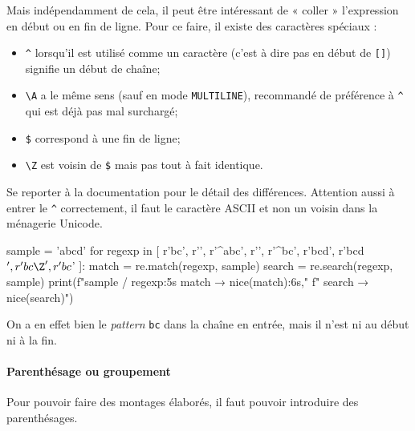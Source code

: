 Mais indépendamment de cela, il peut être intéressant de « coller » l'expression en début ou en fin de ligne. Pour ce faire, il existe des caractères spéciaux :
\begin{itemize}
\item \lstinline[basicstyle={\small\shellttfont}]{^} lorsqu'il est utilisé comme un caractère (c'est à dire pas en début de \texttt{[]}) signifie un début de chaîne;
\item \lstinline[basicstyle={\small\shellttfont}]{\A} a le même sens (sauf en mode \texttt{MULTILINE}), recommandé de préférence à \texttt{\textasciicircum} qui est déjà pas mal surchargé;
\item \lstinline[basicstyle={\small\shellttfont}]{$} correspond à une fin de ligne;
\item \lstinline[basicstyle={\small\shellttfont}]{\Z} est voisin de \texttt{\$} mais pas tout à fait identique.
\end{itemize}

Se reporter à la documentation pour le détail des différences. Attention aussi à entrer le \texttt{\textasciicircum} correctement, il faut le caractère ASCII et non un voisin dans la ménagerie Unicode.

\begin{idleconsole}
	\begin{pyconsole}
sample = 'abcd'
for regexp in [ r'bc', r'\Aabc', r'^abc', 
                r'\Abc', r'^bc', r'bcd\Z', 
                r'bcd$', r'bc\Z', r'bc$' ]:
    match = re.match(regexp, sample)
    search = re.search(regexp, sample)
    print(f"{sample} / {regexp:5s} match → {nice(match):6s},"
          f" search → {nice(search)}")

	\end{pyconsole}
\end{idleconsole}

On a en effet bien le \textit{pattern} \texttt{bc} dans la chaîne en entrée, mais il n'est ni au début ni à la fin.

\paragraph{Parenthésage ou groupement}
Pour pouvoir faire des montages élaborés, il faut pouvoir introduire des parenthésages.

